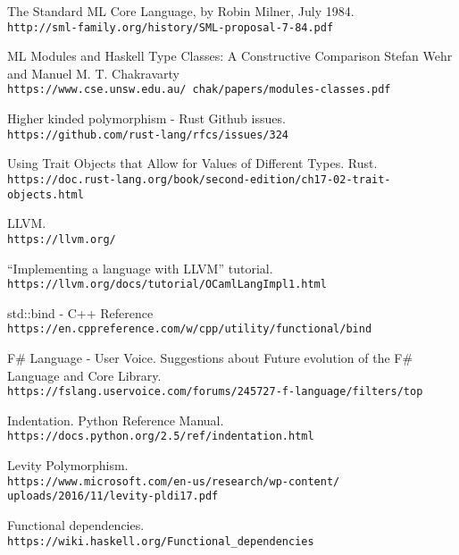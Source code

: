\documentclass[declaration,shortabstract]{iithesis}
\begin{document}
\begin{thebibliography}{1}

The Standard ML Core Language, by Robin Milner, July 1984.
\\\texttt{http://sml-family.org/history/SML-proposal-7-84.pdf}

ML Modules and Haskell Type Classes:
A Constructive Comparison
Stefan Wehr and Manuel M. T. Chakravarty
\\\texttt{https://www.cse.unsw.edu.au/~chak/papers/modules-classes.pdf}

Higher kinded polymorphism - Rust Github issues.
\\\texttt{https://github.com/rust-lang/rfcs/issues/324}

Using Trait Objects that Allow for Values of Different Types. Rust.
\\\texttt{https://doc.rust-lang.org/book/second-edition/ch17-02-trait-objects.html}

LLVM.
\\\texttt{https://llvm.org/}

“Implementing a language with LLVM” tutorial.
\\\texttt{https://llvm.org/docs/tutorial/OCamlLangImpl1.html}

std::bind - C++ Reference
\\\texttt{https://en.cppreference.com/w/cpp/utility/functional/bind}

F\# Language - User Voice.  Suggestions about Future evolution of the 
F\# Language and Core Library.
\\\texttt{https://fslang.uservoice.com/forums/245727-f-language/filters/top}

Indentation. Python Reference Manual.
\\\texttt{https://docs.python.org/2.5/ref/indentation.html}

Levity Polymorphism.
\\\texttt{https://www.microsoft.com/en-us/research/wp-content/\newline
uploads/2016/11/levity-pldi17.pdf}

Functional dependencies.
\\\texttt{https://wiki.haskell.org/Functional\_dependencies}


\end{thebibliography}
\end{document}
